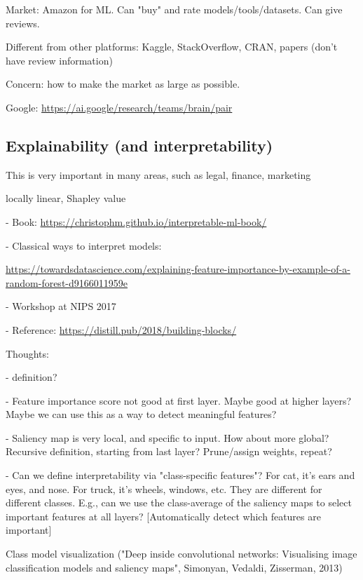 \documentclass[english]{article}
\begin{document}
\item Market: Amazon for ML. Can "buy" and rate models/tools/datasets. Can give reviews. 

Different from other platforms: Kaggle, StackOverflow, CRAN, papers (don't have review information)

Concern: how to make the market as large as possible.  

\item Google: \url{https://ai.google/research/teams/brain/pair}
\eenum 


\subsection{Explainability (and interpretability)}


\benum 
\item This is very important in many areas, such as legal, finance, marketing

locally linear, Shapley value

- Book: \url{https://christophm.github.io/interpretable-ml-book/}


- Classical ways to interpret models: 

\url{https://towardsdatascience.com/explaining-feature-importance-by-example-of-a-random-forest-d9166011959e}

- Workshop at NIPS 2017

- Reference: \url{https://distill.pub/2018/building-blocks/}

\item Thoughts: 

- definition?

- Feature importance score not good at first layer. Maybe good at higher layers? Maybe we can use this as a way to detect meaningful features?

- Saliency map is very local, and specific to input. How about more global? Recursive definition, starting from last layer? Prune/assign weights, repeat?

- Can we define interpretability via "class-specific features"? For cat, it's ears and eyes, and nose. For truck, it's wheels, windows, etc. They are different for different classes. E.g., can we use the class-average of the saliency maps to select important features at all layers? [Automatically detect which features are important]

\item Class model visualization ("Deep inside convolutional networks: Visualising image classification models and saliency maps", Simonyan, Vedaldi, Zisserman, 2013)
\end{document}
